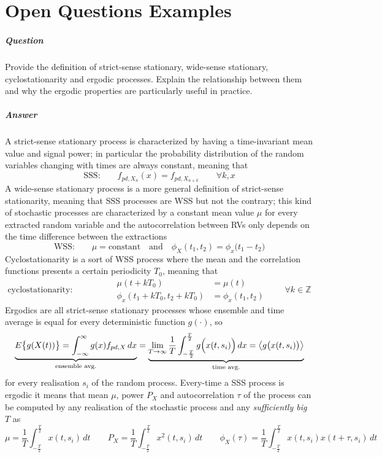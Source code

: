 \chapter{Open Questions Examples}

\newquestion
	\paragraph{Question} Provide the definition of strict-sense stationary, wide-sense stationary, cyclostationarity and ergodic processes. Explain the relationship between them and why the ergodic properties are particularly useful in practice.
	
	\paragraph{Answer} A strict-sense stationary process is characterized by having a time-invariant mean value and signal power; in particular the probability distribution of the random variables changing with times are always constant, meaning that
	\[ \text{SSS:} \qquad f_{pd,X_n}(x) = f_{pd,X_{n+k}} \qquad \forall k,x \]
	A wide-sense stationary process is a more general definition of strict-sense stationarity, meaning that SSS processes are WSS but not the contrary; this kind of stochastic processes are characterized by a constant mean value $\mu$ for every extracted random variable and the autocorrelation between RVs only depends on the time difference between the extractions
	\[ \text{WSS:} \qquad \mu = \textrm{constant} \quad \text{and} \quad \phi_X(t_1,t_2) = \phi_x \big(t_1-t_2\big)  \]
	Cyclostationarity is a sort of WSS process where the mean and the correlation functions presents a certain periodicity $T_0$, meaning that
	\[ \text{cyclostationarity:} \hspace{2cm} \begin{aligned}
		\mu(t+kT_0) & = \mu(t) \\
		\phi_x(t_1 + kT_0,t_2+kT_0) & = \phi_x(t_1,t_2) 
	\end{aligned} \qquad \forall k\in \mathds Z \]
	Ergodics are all strict-sense stationary processes whose ensemble and time average is equal for every deterministic function $g(\cdot)$, so
	\[ \underbrace{E\big\{ g(X(t)) \big\} = \int_{-\infty}^\infty g(x) f_{pd,X}\, dx }_{\text{ensemble avg.}} = \underbrace{\lim_{T\rightarrow\infty} \frac 1 T \int_{-\frac T2}^{\frac T2} g\Big( x(t,s_i) \Big)\, dx = \big\langle g\big( x(t,s_i) \big) \big\rangle }_{\text{time avg.}} \]
	for every realisation $s_i$ of the random process. Every-time a SSS process is ergodic it means that mean $\mu$, power $P_X$ and autocorrelation $\tau$ of the process can be computed by any realisation of the stochastic process and any \textit{sufficiently big} $T$ as
	\[ \mu = \frac 1 T \int_{-\frac T2}^{\frac T2} x(t,s_i)\, dt \qquad P_X = \frac 1 T \int_{-\frac T2}^{\frac T2} x^2(t,s_i)\, dt \qquad \phi_X(\tau) = \frac 1 T \int_{-\frac T2}^{\frac T2} x(t,s_i)x(t+\tau,s_i)\, dt \]
	
